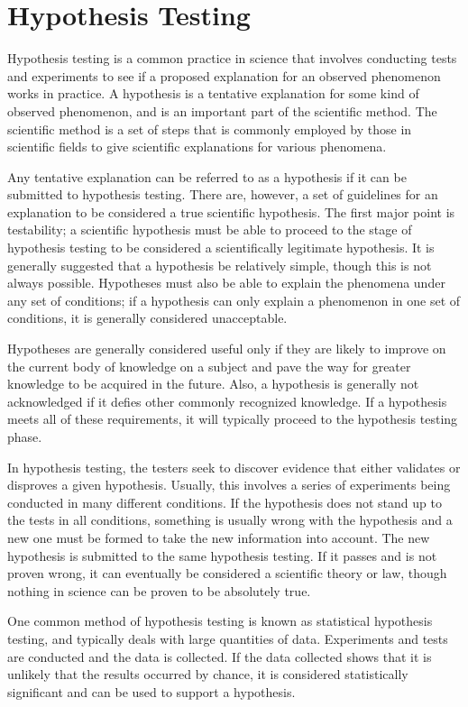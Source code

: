 \documentclass[a4paper,12pt]{article}
\begin{document}
\section{Hypothesis Testing}


Hypothesis testing is a common practice in science that involves conducting tests and experiments to see if a proposed explanation for an observed phenomenon works in practice. A hypothesis is a tentative explanation for some kind of observed phenomenon, and is an important part of the scientific method. The scientific method is a set of steps that is commonly employed by those in scientific fields to give scientific explanations for various phenomena.

Any tentative explanation can be referred to as a hypothesis if it can be submitted to hypothesis testing. There are, however, a set of guidelines for an explanation to be considered a true scientific hypothesis. The first major point is testability; a scientific hypothesis must be able to proceed to the stage of hypothesis testing to be considered a scientifically legitimate hypothesis. It is generally suggested that a hypothesis be relatively simple, though this is not always possible. Hypotheses must also be able to explain the phenomena under any set of conditions; if a hypothesis can only explain a phenomenon in one set of conditions, it is generally considered unacceptable.

Hypotheses are generally considered useful only if they are likely to improve on the current body of knowledge on a subject and pave the way for greater knowledge to be acquired in the future. Also, a hypothesis is generally not acknowledged if it defies other commonly recognized knowledge. If a hypothesis meets all of these requirements, it will typically proceed to the hypothesis testing phase.

In hypothesis testing, the testers seek to discover evidence that either validates or disproves a given hypothesis. Usually, this involves a series of experiments being conducted in many different conditions. If the hypothesis does not stand up to the tests in all conditions, something is usually wrong with the hypothesis and a new one must be formed to take the new information into account. The new hypothesis is submitted to the same hypothesis testing. If it passes and is not proven wrong, it can eventually be considered a scientific theory or law, though nothing in science can be proven to be absolutely true.

One common method of hypothesis testing is known as statistical hypothesis testing, and typically deals with large quantities of data. Experiments and tests are conducted and the data is collected. If the data collected shows that it is unlikely that the results occurred by chance, it is considered statistically significant and can be used to support a hypothesis.
\end{document}
